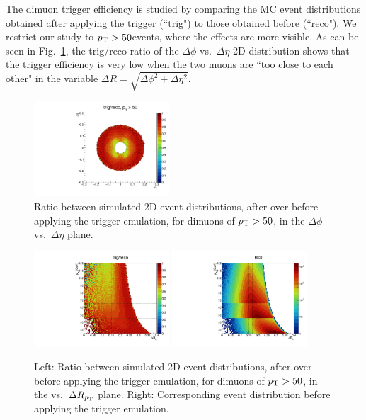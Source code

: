 The dimuon trigger efficiency is studied by comparing the MC event distributions 
obtained after applying the trigger (``trig") to those obtained before (``reco").
We restrict our study to $p_\text{T} > 50$\GeV events, where the effects are more visible.
%
As can be seen in Fig.~\ref{fig:DeltaR},
the trig/reco ratio of the $\Delta\phi$ vs.\ $\Delta\eta$ 2D distribution 
shows that the trigger efficiency is very low when the two muons are 
``too close to each other" in the variable $\Delta R = \sqrt{\Delta\phi^2 + \Delta\eta^2}$.

\begin{figure}[h]
\centering
\includegraphics[width=0.45\textwidth]{Figures/chapter6/AEtaPhi_full.pdf}
\caption{Ratio between simulated 2D event distributions,
after over before applying the trigger emulation, 
for \jpsi dimuons of $p_\text{T} > 50$\GeV, 
in the $\Delta\phi$ vs.\ $\Delta\eta$ plane.}
\label{fig:DeltaR}
\end{figure}

\begin{figure}[ht]
\centering
\includegraphics[width=0.45\textwidth]{Figures/chapter6/RpTpT.pdf}
\includegraphics[width=0.45\textwidth]{Figures/chapter6/RpTpT_r.pdf}
\caption{Left: Ratio between simulated 2D event distributions,
after over before applying the trigger emulation, 
for \jpsi dimuons of $p_\text{T} > 50$\GeV, 
in the \pt vs.\ $\Delta R_{p_\text{T}}$ plane.
Right: Corresponding event distribution before applying the trigger emulation.}
\label{fig:DeltaRpT}
\end{figure}


